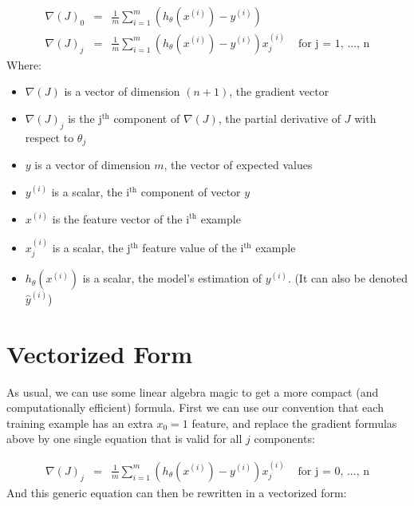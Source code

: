 $$
\begin{matrix}
\nabla(J)_0 &  = &\frac{1}{m}\sum_{i=1}^{m}(h_{\theta}(x^{(i)}) - y^{(i)}) & \\
\nabla(J)_j & = &\frac{1}{m}\sum_{i=1}^{m}(h_{\theta}(x^{(i)}) - y^{(i)})x_{j}^{(i)} & \text{ for j = 1, ..., n}    
\end{matrix}
$$
Where:
\begin{itemize}
    \item $\nabla(J)$ is a vector of dimension $(n + 1)$, the gradient vector
    \item $\nabla(J)_j$ is the j$^\text{th}$ component of $\nabla(J)$, the partial derivative of $J$ with respect to $\theta_j$
    \item $y$ is a vector of dimension $m$, the vector of expected values
    \item $y^{(i)}$ is a scalar, the i$^\text{th}$ component of vector $y$
    \item $x^{(i)}$ is the feature vector of the i$^\text{th}$ example
    \item $x^{(i)}_j$ is a scalar, the j$^\text{th}$ feature value of the i$^\text{th}$ example
    \item $h_{\theta}(x^{(i)})$ is a scalar, the model's estimation of $y^{(i)}$. (It can also be denoted $\hat{y}^{(i)}$)
\end{itemize}

\section*{Vectorized Form}
As usual, we can use some linear algebra magic to get a more compact (and computationally efficient) formula.
First we can use our convention that each training example has an extra $x_0 = 1$ feature, and replace the gradient formulas above by one single equation that is valid for all $j$ components:

$$
\begin{matrix}
\nabla(J)_j & = &\frac{1}{m}\sum_{i=1}^{m}(h_{\theta}(x^{(i)}) - y^{(i)})x_{j}^{(i)} & \text{ for j = 0, ..., n}
\end{matrix}
$$
And this generic equation can then be rewritten in a vectorized form:

